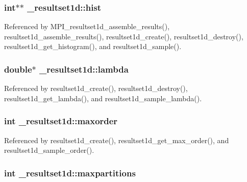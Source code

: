 \subsubsection[{\texorpdfstring{hist}{hist}}]{\setlength{\rightskip}{0pt plus 5cm}int$\ast$$\ast$ \+\_\+resultset1d\+::hist}\hypertarget{struct__resultset1d_a15da81993e5ac31c7c46e459fb9c64d2}{}\label{struct__resultset1d_a15da81993e5ac31c7c46e459fb9c64d2}


Referenced by M\+P\+I\+\_\+resultset1d\+\_\+assemble\+\_\+results(), resultset1d\+\_\+assemble\+\_\+results(), resultset1d\+\_\+create(), resultset1d\+\_\+destroy(), resultset1d\+\_\+get\+\_\+histogram(), and resultset1d\+\_\+sample().

\subsubsection[{\texorpdfstring{lambda}{lambda}}]{\setlength{\rightskip}{0pt plus 5cm}double$\ast$ \+\_\+resultset1d\+::lambda}\hypertarget{struct__resultset1d_a4704008e7f077c87df1ff877a28c8a47}{}\label{struct__resultset1d_a4704008e7f077c87df1ff877a28c8a47}


Referenced by resultset1d\+\_\+create(), resultset1d\+\_\+destroy(), resultset1d\+\_\+get\+\_\+lambda(), and resultset1d\+\_\+sample\+\_\+lambda().

\subsubsection[{\texorpdfstring{maxorder}{maxorder}}]{\setlength{\rightskip}{0pt plus 5cm}int \+\_\+resultset1d\+::maxorder}\hypertarget{struct__resultset1d_a30be3c7ae0f7a5e5d50794c35212c74a}{}\label{struct__resultset1d_a30be3c7ae0f7a5e5d50794c35212c74a}


Referenced by resultset1d\+\_\+create(), resultset1d\+\_\+get\+\_\+max\+\_\+order(), and resultset1d\+\_\+sample\+\_\+order().

\subsubsection[{\texorpdfstring{maxpartitions}{maxpartitions}}]{\setlength{\rightskip}{0pt plus 5cm}int \+\_\+resultset1d\+::maxpartitions}\hypertarget{struct__resultset1d_ab02e20c072248bb32fd689a089263ea2}{}\label{struct__resultset1d_ab02e20c072248bb32fd689a089263ea2}


